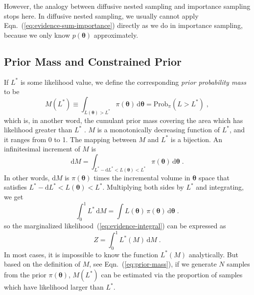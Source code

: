 \documentclass[letterpaper, preprint]{aastex}
\newcommand{\bth} {\boldsymbol \theta}
\newcommand{\md}{\mathrm{d}}
\begin{document}
However, the analogy between diffusive nested sampling and importance sampling stops here. In diffusive nested sampling, we usually cannot apply Eqn.~(\ref{eq:evidence-sum-importance}) directly as we do in importance sampling, because we only know $p(\bth)$ approximately.

\subsection{Prior Mass and Constrained Prior}
If $L^*$ is some likelihood value, we define the corresponding {\em prior probability mass} to be
\begin{equation}
M(L^*) \equiv \int_{L(\bth)>L^*}\!\pi(\bth)\,\md\bth = \mathrm{Prob}_\pi(L>L^*)\; ,
 \label{eq:prior-mass}
\end{equation}
which is, in another word, the cumulant prior mass covering the area which has likelihood greater than $L^*$ \citep{skilling06a}. $M$ is a monotonically decreasing function of $L^*$, and it ranges from 0 to 1. The mapping between $M$ and $L^*$ is a bijection. An infinitesimal increment of $M$ is
\begin{equation}
\mathrm{d}M=\int_{L^*-\mathrm{d}L^*<L(\bth)<L^*}\!\pi(\bth)\,\mathrm{d}\bth \; .
\label{eq:dM}
\end{equation}
In other words, $\md M$ is $\pi(\bth)$ times the incremental volume in $\bth$ space that satisfies $L^*-\mathrm{d}L^*<L(\bth)<L^*$. Multiplying both sides by $L^*$ and integrating, we get
\begin{equation}
\int^1_0\! L^*\,\mathrm{d}M=\int\!L(\bth)\,\pi(\bth)\,\mathrm{d}\bth\; .
\label{eq:int-dM}
\end{equation}
so the marginalized likelihood~(\ref{eq:evidence-integral}) can be expressed as
\begin{equation}
Z=\int^1_0\! L^*(M)\,\mathrm{d}M \;.
 \label{eq:evidence-prior-mass}
\end{equation}
In most cases, it is impossible to know the function $L^*(M)$ analytically. But based on the definition of $M$, see Eqn.~(\ref{eq:prior-mass}), if we generate $N$ samples from the prior $\pi(\bth)$, $M(L^*)$ can be estimated via the proportion of samples which have likelihood larger than $L^*$.
\end{document}
